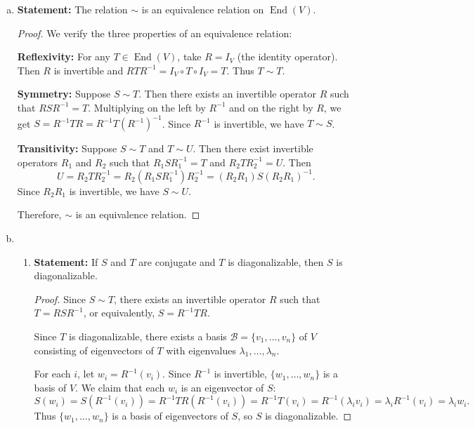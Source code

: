 \documentclass{article}
\begin{document}
\begin{enumerate}[(a)]
    \item \textbf{Statement:} The relation $\sim$ is an equivalence relation on $\operatorname{End}(V)$.

        \begin{proof}
            We verify the three properties of an equivalence relation:
            
            \textbf{Reflexivity:} For any $T \in \operatorname{End}(V)$, take $R = I_V$ (the identity operator). Then $R$ is invertible and $R T R^{-1} = I_V \circ T \circ I_V = T$. Thus $T \sim T$.
            
            \textbf{Symmetry:} Suppose $S \sim T$. Then there exists an invertible operator $R$ such that $R S R^{-1} = T$. Multiplying on the left by $R^{-1}$ and on the right by $R$, we get $S = R^{-1} T R = R^{-1} T (R^{-1})^{-1}$. Since $R^{-1}$ is invertible, we have $T \sim S$.
            
            \textbf{Transitivity:} Suppose $S \sim T$ and $T \sim U$. Then there exist invertible operators $R_1$ and $R_2$ such that $R_1 S R_1^{-1} = T$ and $R_2 T R_2^{-1} = U$. Then
            \[
                U = R_2 T R_2^{-1} = R_2 (R_1 S R_1^{-1}) R_2^{-1} = (R_2 R_1) S (R_2 R_1)^{-1}.
            \]
            Since $R_2 R_1$ is invertible, we have $S \sim U$.
            
            Therefore, $\sim$ is an equivalence relation.
        \end{proof}

        \item 
        \begin{enumerate}[1.]
            \item \textbf{Statement:} If $S$ and $T$ are conjugate and $T$ is diagonalizable, then $S$ is diagonalizable.
            
            \begin{proof}
                Since $S \sim T$, there exists an invertible operator $R$ such that $T = R S R^{-1}$, or equivalently, $S = R^{-1} T R$.
                
                Since $T$ is diagonalizable, there exists a basis $\mathscr{B} = \{v_1, \ldots, v_n\}$ of $V$ consisting of eigenvectors of $T$ with eigenvalues $\lambda_1, \ldots, \lambda_n$.
                
                For each $i$, let $w_i = R^{-1}(v_i)$. Since $R^{-1}$ is invertible, $\{w_1, \ldots, w_n\}$ is a basis of $V$. We claim that each $w_i$ is an eigenvector of $S$:
                \[
                    S(w_i) = S(R^{-1}(v_i)) = R^{-1} T R (R^{-1}(v_i)) = R^{-1} T (v_i) = R^{-1}(\lambda_i v_i) = \lambda_i R^{-1}(v_i) = \lambda_i w_i.
                \]
                Thus $\{w_1, \ldots, w_n\}$ is a basis of eigenvectors of $S$, so $S$ is diagonalizable.
            \end{proof}
            

\end{enumerate}
\end{enumerate}
\end{document}

